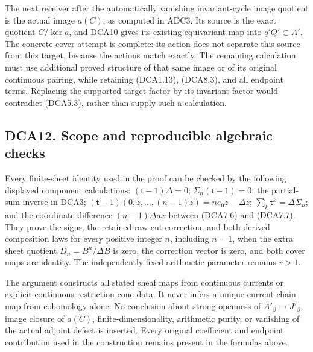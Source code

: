 The next receiver after the automatically vanishing invariant-cycle
image quotient is the actual image \(a(C)\), as computed in ADC3. Its
source is the exact quotient \(C/\ker a\), and DCA10 gives its existing
equivariant map into \(q'Q'\subset A'\). The concrete cover attempt is
complete: its action does not separate this source from this target,
because the actions match exactly. The remaining calculation must use
additional proved structure of that same image or of its original
continuous pairing, while retaining (DCA1.13), (DCA8.3), and all
endpoint terms. Replacing the supported target factor by its invariant
factor would contradict (DCA5.3), rather than supply such a calculation.

\subsection{DCA12. Scope and reproducible algebraic
checks}\label{dca12.-scope-and-reproducible-algebraic-checks}

Every finite-sheet identity used in the proof can be checked by the
following displayed component calculations: \((\mathsf t-1)\Delta=0\);
\(\Sigma_n(\mathsf t-1)=0\); the partial-sum inverse in DCA3;
\((\mathsf t-1)(0,z,\ldots,(n-1)z)=ne_0z-\Delta z\);
\(\sum_k\mathsf t^k=\Delta\Sigma_n\); and the coordinate difference
\((n-1)\Delta ax\) between (DCA7.6) and (DCA7.7). They prove the signs,
the retained raw-cut correction, and both derived composition laws for
every positive integer \(n\), including \(n=1\), when the extra sheet
quotient \(D_n=B^n/\Delta B\) is zero, the correction vector is zero,
and both cover maps are identity. The independently fixed arithmetic
parameter remains \(r>1\).

The argument constructs all stated sheaf maps from continuous currents
or explicit continuous restriction-cone data. It never infers a unique
current chain map from cohomology alone. No conclusion about strong
openness of \(A'_\beta\to J'_\beta\), image closure of \(a(C)\),
finite-dimensionality, arithmetic purity, or vanishing of the actual
adjoint defect is inserted. Every original coefficient and endpoint
contribution used in the construction remains present in the formulas
above.
